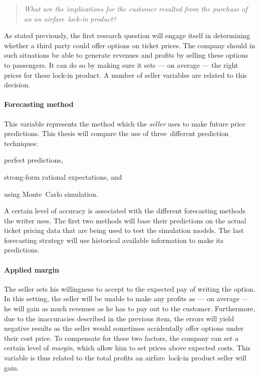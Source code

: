 \begin{quote}\emph{What are the implications for the customer resulted from the purchase of an an airfare~lock-in product?}\end{quote}

As stated previously, the first research question will engage itself in determining whether a third party could offer options on ticket prices. The company should in such situations be able to generate revenues and profits by selling these options to passengers. It can do so by making sure it sets --- on average --- the right prices for these lock-in product. A number of seller variables are related to this decision.

\paragraph{Forecasting method} This variable represents the method which the \emph{seller} uses to make future price predictions. This thesis will compare the use of three~different prediction techniques:
\begin{compactitem}
    \item perfect predictions,
    \item strong-form rational expectations, and
    \item using Monte~Carlo simulation.
\end{compactitem}

A certain level of accuracy is associated with the different forecasting methods the writer uses. The first two methods will base their predictions on the actual ticket pricing data that are being used to test the simulation models. The last forecasting strategy will use historical available information to make its predictions.

\paragraph{Applied margin} The seller sets his willingness to accept to the expected pay of writing the option. In this setting, the seller will be unable to make any profits as --- on average --- he will gain as much revenues as he has to pay out to the customer. Furthermore, due to the inaccuracies described in the previous item, the errors will yield negative results as the seller would sometimes accidentally offer options under their cost price. To compensate for these two factors, the company can set a certain level of \emph{margin}, which allow him to set prices above expected costs. This variable is thus related to the total profits an airfare~lock-in product seller will gain.


